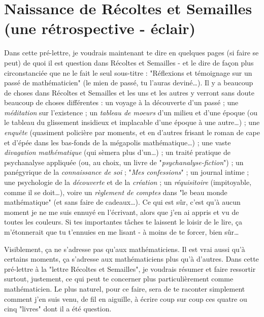 \section{Naissance de Récoltes et Semailles (une rétrospective - éclair)}

Dans cette pré-lettre, je voudrais maintenant te dire en quelques pages (si faire se peut) de quoi il est question dans Récoltes et Semailles - et le dire de façon plus circonstanciée que ne le fait le seul sous-titre : "Réflexions et témoignage sur un passé de mathématicien" (le mien de passé, tu l'auras deviné\ldots). Il y a beaucoup de choses dans Récoltes et Semailles et les uns et les autres y verront sans doute beaucoup de choses différentes : un voyage à la découverte d'un passé ; une \textit{méditation} sur l'existence ; un \textit{tableau de moeurs} d'un milieu et d'une époque (ou le tableau du glissement insidieux et implacable d'une époque à une autre\ldots) ; une \textit{enquête} (quasiment policière par moments, et en d'autres frisant le roman de cape et d'épée dans les bas-fonds de la mégapolis mathématique\ldots) ; une vaste \textit{divagation mathématique} (qui sèmera plus d'un\ldots) ; un traité pratique de psychanalyse appliquée (ou, au choix, un livre de "\textit{psychanalyse-fiction}") ; un panégyrique de la \textit{connaissance de soi} ; "\textit{Mes confessions}" ; un journal intime ; une psychologie de la \textit{découverte} et de la \textit{création} ; un \textit{réquisitoire} (impitoyable, comme il se doit\ldots), voire un \textit{règlement de comptes} dans "le beau monde mathématique" (et sans faire de cadeaux\ldots). Ce qui est sûr, c'est qu'à aucun moment je ne me suis ennuyé en l'écrivant, alors que j'en ai appris et vu de toutes les couleurs. Si tes importantes tâches te laissent le loisir de le lire, ça m'étonnerait que tu t'ennuies en me lisant - à moins de te forcer, bien sûr\ldots

Visiblement, ça ne s'adresse pas qu'aux mathématiciens. Il est vrai aussi qu'à certains moments, ça s'adresse aux mathématiciens plus qu'à d'autres. Dans cette pré-lettre à la "lettre Récoltes et Semailles", je voudrais résumer et faire ressortir surtout, justement, ce qui peut te concerner plus particulièrement comme mathématicien. Le plus naturel, pour ce faire, sera de te raconter simplement comment j'en suis venu, de fil en aiguille, à écrire coup sur coup ces quatre ou cinq "livres" dont il a été question.

